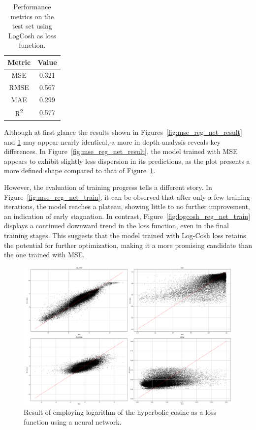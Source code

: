 \begin{table}[H]
    \centering
    \begin{tabular}{|c|c|}
    \hline
    \textbf{Metric} & \textbf{Value} \\
    \hline
    MSE & 0.321 \\
    RMSE & 0.567 \\
    MAE & 0.299 \\
    R\textsuperscript{2} & 0.577 \\
    \hline
    \end{tabular}
    \caption{Performance metrics on the test set using LogCosh as loss function.}
    \label{tab:test_metrics_logcosh}
\end{table}

Although at first glance the results shown in Figures~\ref{fig:mse_reg_net_result} and \ref{fig:logcosh_reg_net_result} may appear nearly identical, a more in depth analysis reveals key differences. In Figure~\ref{fig:mse_reg_net_result}, the model trained with MSE appears to exhibit slightly less dispersion in its predictions, as the plot presents a more defined shape compared to that of Figure~\ref{fig:logcosh_reg_net_result}.

However, the evaluation of training progress tells a different story. In Figure~\ref{fig:mse_reg_net_train}, it can be observed that after only a few training iterations, the model reaches a plateau, showing little to no further improvement, an indication of early stagnation. In contrast, Figure~\ref{fig:logcosh_reg_net_train} displays a continued downward trend in the loss function, even in the final training stages. This suggests that the model trained with Log-Cosh loss retains the potential for further optimization, making it a more promising candidate than the one trained with MSE.


\begin{figure}[H]
    \centering
    \includegraphics[width=1\textwidth]{figures/neural_net_regression_research/output_neural_net_logcosh.png}
    \caption{Result of employing logarithm of the hyperbolic cosine as a loss function using a neural network.}
    \label{fig:logcosh_reg_net_result}
\end{figure}


